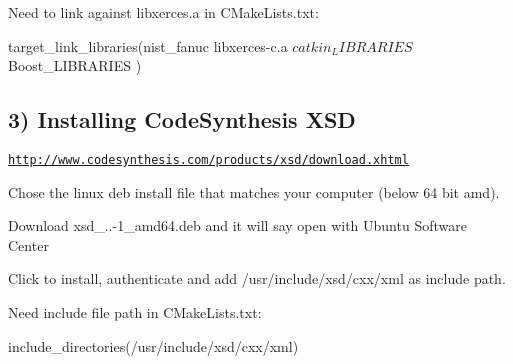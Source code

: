 Need to link against libxerces.\-a in C\-Make\-Lists.\-txt\-: \begin{DoxyVerb}target_link_libraries(nist_fanuc 
libxerces-c.a  
${catkin_LIBRARIES}
${Boost_LIBRARIES}
)
\end{DoxyVerb}


\subsection*{3) Installing Code\-Synthesis X\-S\-D }

\href{http://www.codesynthesis.com/products/xsd/download.xhtml}{\tt http\-://www.\-codesynthesis.\-com/products/xsd/download.\-xhtml}
\begin{DoxyEnumerate}
\item Chose the linux deb install file that matches your computer (below 64 bit amd).
\item Download xsd\-\_..-\/1\-\_\-amd64.\-deb and it will say open with Ubuntu Software Center
\item Click to install, authenticate and add /usr/include/xsd/cxx/xml as include path.
\end{DoxyEnumerate}

Need include file path in C\-Make\-Lists.\-txt\-: \begin{DoxyVerb}include_directories(/usr/include/xsd/cxx/xml)\end{DoxyVerb}
 
